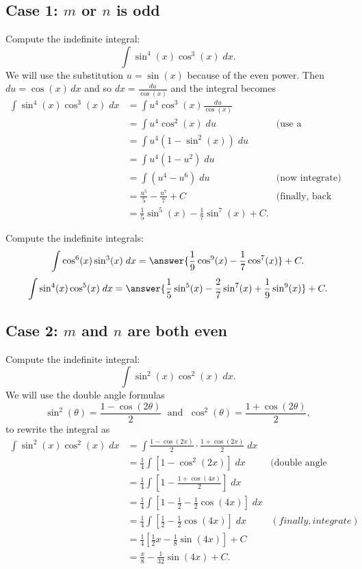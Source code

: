 \documentclass{ximera}
\begin{document}
\subsection{Case 1: $m$ or $n$ is odd}
\begin{example}
Compute the indefinite integral:
\[
\int \sin^4(x)\cos^3(x) \; dx.
\]
We will use the substitution $u = \sin(x)$ because of the even power.
Then $du = \cos(x) \, dx$ and so $dx = \frac{du}{\cos(x)}$ and the integral becomes
\begin{align*}
\int \sin^4(x)\cos^3(x) \; dx &= \int u^4 \cos^3(x) \frac{du}{\cos(x)}\\
   &= \int u^4 \cos^2(x) \; du &
   \text{(use a Pythagorean identity)}\\
   &= \int u^4 (1-\sin^2(x)) \; du\\
   &= \int u^4 (1-u^2) \; du\\
   &= \int (u^4 -u^6) \; du &
  \text{(now integrate)}\\
  &= \frac{u^5}{5} - \frac{u^7}{7} + C &  \text{(finally, back substitute)}\\
  &= \frac15 \sin^5(x) - \frac17 \sin^7(x) + C.
\end{align*}
  
\end{example}

\begin{problem}
Compute the indefinite integrals:
\[
\int \cos^6(x)\sin^3(x) \; dx = \answer{\frac19 \cos^9(x) - \frac17 \cos^7(x)} + C.
\]
\[
\int \sin^4(x)\cos^5(x) \; dx = \answer{\frac15 \sin^5(x) - \frac27 \sin^7(x)+\frac19 \sin^9(x)} + C.
\]
\end{problem}

\subsection{Case 2: $m$ and $n$ are both even}
\begin{example}
Compute the indefinite integral:
\[
\int \sin^2(x)\cos^2(x) \; dx.
\]
We will use the double angle formulas
\[
\sin^2(\theta) = \frac{1-\cos(2\theta)}{2} \; \text{ and } \; \cos^2(\theta) = \frac{1+\cos(2\theta)}{2},
\]
to rewrite the integral as
\begin{align*}
\int \sin^2(x)\cos^2(x) \; dx &= \int \frac{1-\cos(2x)}{2}\cdot \frac{1+\cos(2x)}{2} \; dx\\
  &= \frac14 \int \left[1 - \cos^2(2x)\right] \; dx &
  \text{(double angle formula again)}\\
  &= \frac14 \int \left[ 1- \frac{1+\cos(4x)}{2}\right] \; dx\\
  &= \frac14 \int \left[1-\frac12 - \frac12\cos(4x)\right] \; dx\\
  &= \frac14 \int \left[\frac12 - \frac12\cos(4x)\right] \; dx & (finally, integrate)\\
  &= \frac14 \left[\frac12 x  - \frac18\sin(4x)\right] + C\\
  &= \frac{x}{8}  - \frac{1}{32}\sin(4x) + C.
\end{align*}
\end{example}
\end{document}
